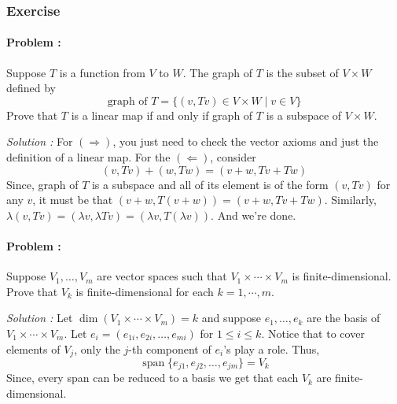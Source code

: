 \subsubsection{Exercise}

\paragraph{Problem :} Suppose $T$ is a function from $V$ to $W$. The graph of $T$ is the subset of $V \times W$ defined by
\[ \text{graph of } T = \{(v,Tv) \in V \times W \mid v \in V\} \]
Prove that $T$ is a linear map if and only if graph of $T$ is a subspace of $V \times W$.

\vspace{4mm}
\textit{Solution :} For $(\Rightarrow)$, you just need to check the vector axioms and just the definition of a linear map.
For the $(\Leftarrow)$, consider 
\[ (v,Tv) + (w,Tw) = (v+w,Tv+Tw) \]
Since, graph of $T$ is a subspace and all of its element is of the form $(v,Tv)$ for any $v$, it must be that $(v+w,T(v+w))=(v+w,Tv+Tw)$.
Similarly, $\lambda(v,Tv) = (\lambda v , \lambda Tv) = (\lambda v, T (\lambda v))$. And we're done.

\paragraph{Problem :} Suppose $V_1, \ldots, V_m$ are vector spaces such that $V_1 \times \cdots \times V_m$ is finite-dimensional. Prove that
$V_k$ is finite-dimensional for each $k=1,\cdots,m$.

\vspace{4mm}
\textit{Solution :} Let $\dim (V_1 \times \cdots \times V_m)=k$ and suppose $e_1,\ldots,e_k$ are the basis of $V_1 \times \cdots \times V_m$.
Let $e_i=(e_{1i},e_{2i},\ldots,e_{mi})$ for $1 \le i \le k$. Notice that to cover elements of $V_j$, only the $j$-th component of $e_i$'s 
play a role. Thus,
\[ \operatorname{span}\{e_{j1},e_{j2},\ldots,e_{jm}\} = V_k \]
Since, every span can be reduced to a basis we get that each $V_k$ are finite-dimensional.